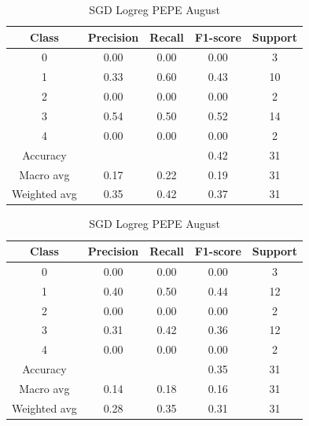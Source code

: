 \begin{enumerate}
\begin{enumerate}
                \begin{table}[H]
                \centering
                \scriptsize
                \begin{minipage}{0.48\textwidth}
                \centering
                \begin{tabular}{c|cccc}
                \hline
                Class & Precision & Recall & F1-score & Support \\
                \hline
                0 & 0.00 & 0.00 & 0.00 & 3 \\
                1 & 0.33 & 0.60 & 0.43 & 10 \\
                2 & 0.00 & 0.00 & 0.00 & 2 \\
                3 & 0.54 & 0.50 & 0.52 & 14 \\
                4 & 0.00 & 0.00 & 0.00 & 2 \\
                \hline
                Accuracy &       &      & 0.42 & 31 \\
                Macro avg & 0.17 & 0.22 & 0.19 & 31 \\
                Weighted avg & 0.35 & 0.42 & 0.37 & 31 \\
                \hline
                \end{tabular}
                \caption{SGD Logreg DOGE August}
                \label{tab:classifier_2_report_sgd_logreg_doge_filtered_aug}
                \end{minipage}
                \hfill
                \begin{minipage}{0.48\textwidth}
                \centering
                \begin{tabular}{c|cccc}
                \hline
                Class & Precision & Recall & F1-score & Support \\
                \hline
                0 & 0.00 & 0.00 & 0.00 & 3 \\
                1 & 0.40 & 0.50 & 0.44 & 12 \\
                2 & 0.00 & 0.00 & 0.00 & 2 \\
                3 & 0.31 & 0.42 & 0.36 & 12 \\
                4 & 0.00 & 0.00 & 0.00 & 2 \\
                \hline
                Accuracy &       &      & 0.35 & 31 \\
                Macro avg & 0.14 & 0.18 & 0.16 & 31 \\
                Weighted avg & 0.28 & 0.35 & 0.31 & 31 \\
                \hline
                \end{tabular}
                \caption{SGD Logreg PEPE August}
                \label{tab:classifier_2_report_sgd_logreg_pepe_filtered_aug}
                \end{minipage}
                

\end{table}
\end{enumerate}
\end{enumerate}
